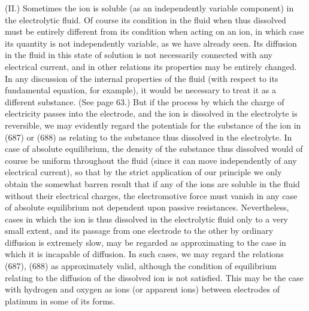 \documentclass[12pt]{memoir}
\begin{document}
(II.) Sometimes the ion is soluble (as an independently variable component) in the electrolytic fluid. Of course its condition in the fluid when thus dissolved must be entirely different from its condition when acting on an ion, in which case its quantity is not independently variable, as we have already seen. Its diffusion in the fluid in this state of solution is not necessarily connected with any electrical current, and in other relations its properties may be entirely changed. In any discussion of the internal properties of the fluid (with respect to its fundamental equation, for example), it would be necessary to treat it as a different substance. (See page 63.) But if the process by which the charge of electricity passes into the electrode, and the ion is dissolved in the electrolyte is reversible, we may evidently regard the potentials for the substance of the ion in (687) or (688) as relating to the substance thus dissolved in the electrolyte. In case of absolute equilibrium, the density of the substance thus dissolved would of course be uniform throughout the fluid (since it can move independently of any electrical current), so that by the strict application of our principle we only obtain the somewhat barren result that if any of the ions are soluble in the fluid without their electrical charges, the electromotive force must vanish in any case of absolute equilibrium not dependent upon passive resistances. Nevertheless, cases in which the ion is thus dissolved in the electrolytic fluid only to a very small extent, and its passage from one electrode to the other by ordinary diffusion is extremely slow, may be regarded as approximating to the case in which it is incapable of diffusion. In such cases, we may regard the relations (687), (688) as approximately valid, although the condition of equilibrium relating to the diffusion of the dissolved ion is not satisfied. This may be the case with hydrogen and oxygen as ions (or apparent ions) between electrodes of platinum in some of its forms.
\end{document}
